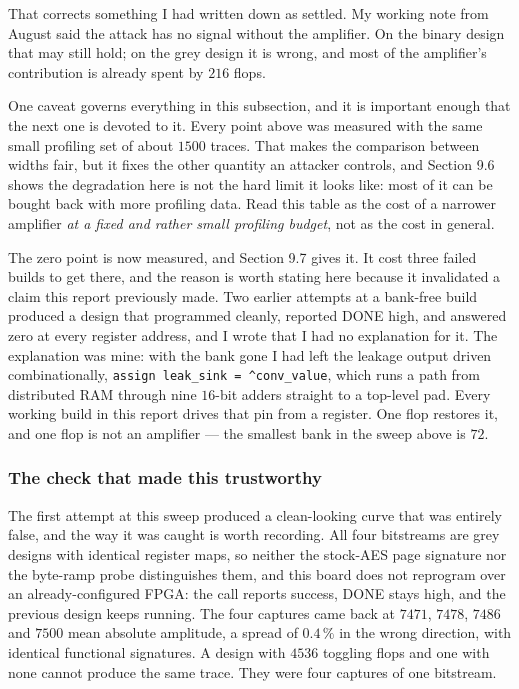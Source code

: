 \documentclass[11pt,a4paper]{article}
\begin{document}
That corrects something I had written down as settled. My working note from August said
the attack has no signal without the amplifier. On the binary design that may still hold;
on the grey design it is wrong, and most of the amplifier's contribution is already spent
by $216$ flops.

One caveat governs everything in this subsection, and it is important enough that the
next one is devoted to it. Every point above was measured with the same small profiling
set of about $1500$ traces. That makes the comparison between widths fair, but it fixes
the other quantity an attacker controls, and Section 9.6 shows the degradation here is
not the hard limit it looks like: most of it can be bought back with more profiling
data. Read this table as the cost of a narrower amplifier \emph{at a fixed and rather
small profiling budget}, not as the cost in general.

The zero point is now measured, and Section 9.7 gives it. It cost three failed builds to
get there, and the reason is worth stating here because it invalidated a claim this report
previously made. Two earlier attempts at a bank-free build produced a design that
programmed cleanly, reported DONE high, and answered zero at every register address, and I
wrote that I had no explanation for it. The explanation was mine: with the bank gone I had
left the leakage output driven combinationally, \texttt{assign leak\_sink = \^{}conv\_value},
which runs a path from distributed RAM through nine $16$-bit adders straight to a top-level
pad. Every working build in this report drives that pin from a register. One flop restores
it, and one flop is not an amplifier --- the smallest bank in the sweep above is $72$.

\subsubsection*{The check that made this trustworthy}

The first attempt at this sweep produced a clean-looking curve that was entirely false,
and the way it was caught is worth recording. All four bitstreams are grey designs with
identical register maps, so neither the stock-AES page signature nor the byte-ramp probe
distinguishes them, and this board does not reprogram over an already-configured FPGA:
the call reports success, DONE stays high, and the previous design keeps running. The
four captures came back at $7471$, $7478$, $7486$ and $7500$ mean absolute amplitude, a
spread of $0.4\,\%$ in the wrong direction, with identical functional signatures. A design
with $4536$ toggling flops and one with none cannot produce the same trace. They were four
captures of one bitstream.
\end{document}
